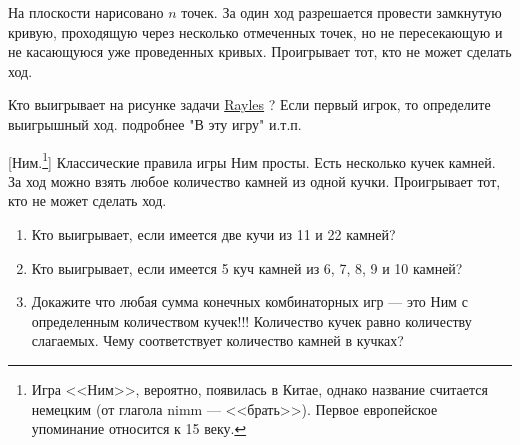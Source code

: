 \begin{problem}
На плоскости нарисовано  $n$  точек. За один ход разрешается провести замкнутую кривую, проходящую через несколько отмеченных точек, но не пересекающую и не касающуюся уже проведенных кривых. Проигрывает тот, кто не может сделать ход.\par
Кто выигрывает на рисунке задачи \hyperref[Rayles]{Rayles} ? Если первый игрок, то определите выигрышный ход. {\red подробнее "В эту игру" и.т.п.}

\begin{sol}

\end{sol}
\end{problem}



\begin{problem}\label{Z:Nim}[Ним.\footnote{Игра <<Ним>>, вероятно, появилась в Китае, однако название считается немецким (от глагола nimm --- <<брать>>). Первое европейское упоминание относится к 15 веку.}]
Классические правила игры Ним просты. Есть несколько кучек камней. За ход можно взять любое количество камней из одной кучки. Проигрывает тот, кто не может сделать ход.\par
\begin{enumerate}
\item 	Кто выигрывает, если имеется две кучи из 11 и 22 камней?\par
\item 	Кто выигрывает, если имеется 5 куч камней из 6, 7, 8, 9 и 10 камней?\par
\item 	Докажите что любая сумма конечных комбинаторных игр --- это Ним с определенным количеством кучек!!! Количество кучек равно количеству слагаемых. Чему соответствует количество камней в кучках?
\end{enumerate}



\begin{sol}

\end{sol}
\end{problem}



